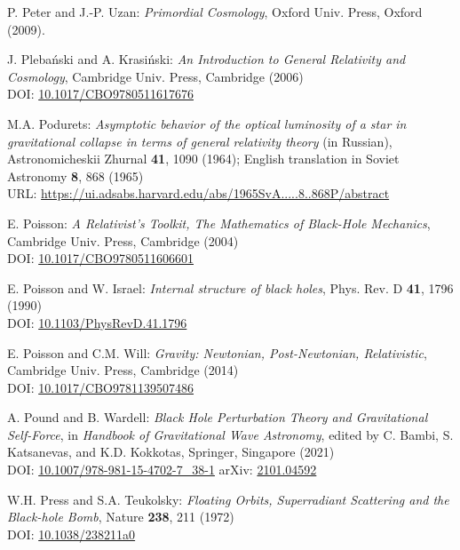 \begin{thebibliography}{123}
P. Peter and J.-P. Uzan: {\em Primordial Cosmology},
Oxford Univ. Press, Oxford (2009).

J. Pleba\'nski and A. Krasi\'nski:
{\em An Introduction to General Relativity and Cosmology},
Cambridge Univ. Press, Cambridge (2006)\\
DOI: \href{https://doi.org/10.1017/CBO9780511617676}{10.1017/CBO9780511617676}

M.A. Podurets:
{\em Asymptotic behavior of the optical luminosity of a star in gravitational collapse
in terms of general relativity theory}
(in Russian),
Astronomicheskii Zhurnal {\bf 41}, 1090 (1964);
English translation in Soviet Astronomy {\bf 8}, 868 (1965)\\
URL: \url{https://ui.adsabs.harvard.edu/abs/1965SvA.....8..868P/abstract}

E. Poisson: \emph{A Relativist's Toolkit,
The Mathematics of Black-Hole Mechanics},
Cambridge Univ. Press, Cambridge (2004) \\
DOI: \href{https://doi.org/10.1017/CBO9780511606601}{10.1017/CBO9780511606601}

E. Poisson and W. Israel: {\em Internal structure of black holes},
Phys. Rev. D {\bf 41}, 1796 (1990) \\
DOI: \href{https://doi.org/10.1103/PhysRevD.41.1796}{10.1103/PhysRevD.41.1796}

E. Poisson and C.M. Will: {\em Gravity: Newtonian, Post-Newtonian, Relativistic},
Cambridge Univ. Press, Cambridge (2014) \\
DOI: \href{https://doi.org/10.1017/CBO9781139507486}{10.1017/CBO9781139507486}

A. Pound and B. Wardell:
{\em Black Hole Perturbation Theory and Gravitational Self-Force},
in {\em Handbook of Gravitational Wave Astronomy}, edited by
C. Bambi, S. Katsanevas, and K.D. Kokkotas,
Springer, Singapore (2021)\\
DOI: \href{https://doi.org/10.1007/978-981-15-4702-7_38-1}{10.1007/978-981-15-4702-7\_38-1}\hfill
arXiv: \href{https://arxiv.org/abs/2101.04592}{2101.04592}

W.H. Press and S.A. Teukolsky:
{\em Floating Orbits, Superradiant Scattering and the Black-hole Bomb},
Nature {\bf 238}, 211 (1972)\\
DOI: \href{https://doi.org/10.1038/238211a0}{10.1038/238211a0}


\end{thebibliography}
